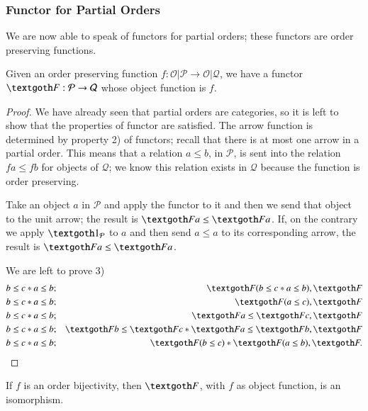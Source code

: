 \documentclass [12pt]{book}
\begin{document}
			\subsubsection{Functor for Partial Orders}

We are now able to speak of functors for partial orders; these functors are order preserving functions.

\begin{lemma func par}Given an order preserving function $f:\mathcal{O|P}\rightarrow\mathcal{O|Q}$, we have a functor $\textgoth F:\mathcal P\rightarrow\mathcal Q$ whose object function is $f$.\end{lemma func par}

\begin{proof}We have already seen that partial orders are categories, so it is left to show that the properties of functor are satisfied. The arrow function is determined by property 2) of functors; recall that there is at most one arrow in a partial order. This means that a relation $a\leq b$, in $\mathcal P$, is sent into the relation $fa\leq fb$ for objects of $\mathcal Q$; we know this relation exists in $\mathcal Q$ because the function is order preserving.

Take an object $a$ in $\mathcal P$ and apply the functor to it and then we send that object to the unit arrow; the result is $\textgoth Fa\leq\textgoth Fa$. If, on the contrary we apply $\textgoth1_\mathcal P$ to $a$ and then send $a\leq a$ to its corresponding arrow, the result is $\textgoth Fa\leq\textgoth Fa$.

We are left to prove 3)\begin{eqnarray}\nonumber b\leq c*a\leq b&;&\textgoth F(b\leq c*a\leq b),\textgoth F\\\nonumber b\leq c*a\leq b&;&\textgoth F(a\leq c),\textgoth F\\\nonumber b\leq c*a\leq b&;&\textgoth Fa\leq\textgoth Fc,\textgoth F\\\nonumber b\leq c*a\leq b&;&\textgoth Fb\leq\textgoth Fc*\textgoth Fa\leq\textgoth F b,\textgoth F\\\nonumber b\leq c*a\leq b&;&\textgoth F(b\leq c)*\textgoth F(a\leq b),\textgoth F.\end{eqnarray}\end{proof}

\begin{theorem}If $f$ is an order bijectivity, then $\textgoth F$, with $f$ as object function, is an isomorphism.\end{theorem}
\end{document}
